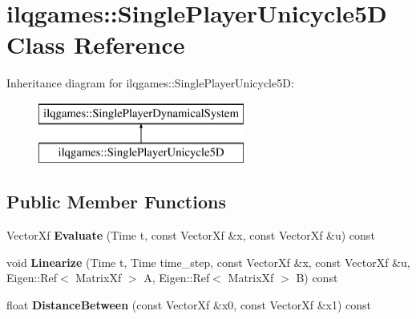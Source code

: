 \hypertarget{classilqgames_1_1_single_player_unicycle5_d}{}\section{ilqgames\+:\+:Single\+Player\+Unicycle5D Class Reference}
\label{classilqgames_1_1_single_player_unicycle5_d}
Inheritance diagram for ilqgames\+:\+:Single\+Player\+Unicycle5D\+:\begin{figure}[H]
\begin{center}
\leavevmode
\includegraphics[height=2.000000cm]{classilqgames_1_1_single_player_unicycle5_d}
\end{center}
\end{figure}
\subsection*{Public Member Functions}
\begin{DoxyCompactItemize}
\item 
Vector\+Xf {\bfseries Evaluate} (Time t, const Vector\+Xf \&x, const Vector\+Xf \&u) const \hypertarget{classilqgames_1_1_single_player_unicycle5_d_a51f0dd94b0872632256ab0e31b760569}{}\label{classilqgames_1_1_single_player_unicycle5_d_a51f0dd94b0872632256ab0e31b760569}

\item 
void {\bfseries Linearize} (Time t, Time time\+\_\+step, const Vector\+Xf \&x, const Vector\+Xf \&u, Eigen\+::\+Ref$<$ Matrix\+Xf $>$ A, Eigen\+::\+Ref$<$ Matrix\+Xf $>$ B) const \hypertarget{classilqgames_1_1_single_player_unicycle5_d_abdfb1b8da8b6a60deacd6de1e2370264}{}\label{classilqgames_1_1_single_player_unicycle5_d_abdfb1b8da8b6a60deacd6de1e2370264}

\item 
float {\bfseries Distance\+Between} (const Vector\+Xf \&x0, const Vector\+Xf \&x1) const \hypertarget{classilqgames_1_1_single_player_unicycle5_d_ac20c427901e0e594d63155d0d7944b70}{}\label{classilqgames_1_1_single_player_unicycle5_d_ac20c427901e0e594d63155d0d7944b70}

\end{DoxyCompactItemize}
